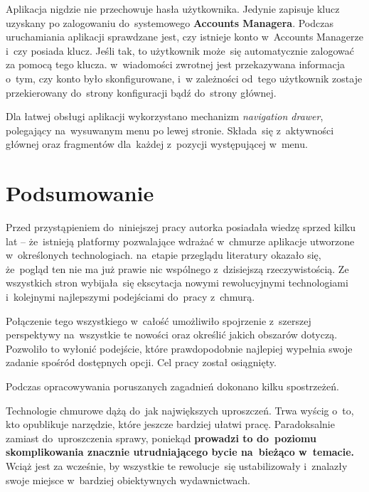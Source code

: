 \documentclass[12pt,a4paper,twoside,titlepage,openright]{book}
\begin{document}
Aplikacja nigdzie nie przechowuje hasła użytkownika. Jedynie zapisuje klucz uzyskany po zalogowaniu do~systemowego \textbf{Accounts Managera}. Podczas uruchamiania aplikacji sprawdzane jest, czy istnieje konto w~Accounts Managerze i~czy posiada klucz. Jeśli tak, to użytkownik może~się automatycznie zalogować za pomocą tego klucza. w~wiadomości zwrotnej jest przekazywana informacja o~tym, czy konto było skonfigurowane, i~w zależności od~tego użytkownik zostaje przekierowany do~strony konfiguracji bądź do~strony głównej.

Dla łatwej obsługi aplikacji wykorzystano mechanizm \textit{navigation drawer}, polegający na~wysuwanym menu po lewej stronie. Składa~się z~aktywności głównej oraz fragmentów dla~każdej z~pozycji występującej w~menu.


\chapter*{Podsumowanie}
 
Przed przystąpieniem do~niniejszej pracy autorka posiadała wiedzę sprzed kilku lat -- że~istnieją platformy pozwalające wdrażać w~chmurze aplikacje utworzone w~określonych technologiach. na~etapie przeglądu literatury okazało się, że~pogląd ten nie ma już prawie nic wspólnego z~dzisiejszą rzeczywistością. Ze wszystkich stron wybijała~się ekscytacja nowymi rewolucyjnymi technologiami i~kolejnymi najlepszymi podejściami do~pracy z~chmurą. 

Połączenie tego wszystkiego w~całość umożliwiło spojrzenie z~szerszej perspektywy na~wszystkie te nowości oraz określić jakich obszarów dotyczą. Pozwoliło to wyłonić podejście, które prawdopodobnie najlepiej wypełnia swoje zadanie spośród dostępnych opcji. Cel pracy został osiągnięty.

Podczas opracowywania poruszanych zagadnień dokonano kilku spostrzeżeń.

Technologie chmurowe dążą do~jak największych uproszczeń. Trwa wyścig o~to, kto opublikuje narzędzie, które jeszcze bardziej ułatwi pracę. Paradoksalnie zamiast do~uproszczenia sprawy, poniekąd \textbf{prowadzi to do~poziomu skomplikowania znacznie utrudniającego bycie na~bieżąco w~temacie.} Wciąż jest za wcześnie, by wszystkie te rewolucje~się ustabilizowały i~znalazły swoje miejsce w~bardziej obiektywnych wydawnictwach. 
\end{document}
